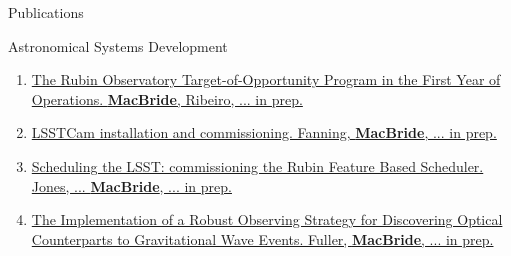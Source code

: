 \documentclass{resume} %
\begin{document}
\begin{rSection}{Publications}
\begin{rSubsection}{Astronomical Systems Development}{}{}{}
\begin{enumerate}
    \item \href{}{The Rubin Observatory Target-of-Opportunity Program in the First Year of Operations. \textbf{MacBride}, Ribeiro, ... in prep.}
    \item \href{}{\ac{LSSTCam} installation and commissioning. Fanning, \textbf{MacBride}, ... in prep.}
    \item \href{}{Scheduling the LSST: commissioning the Rubin Feature Based Scheduler. Jones, ... \textbf{MacBride}, ... in prep.}
    \item \href{}{The Implementation of a Robust Observing Strategy for Discovering Optical Counterparts to Gravitational Wave Events. Fuller, \textbf{MacBride}, ... in prep.}
\end{enumerate}
\end{rSubsection}
\end{rSection}
\end{document}

